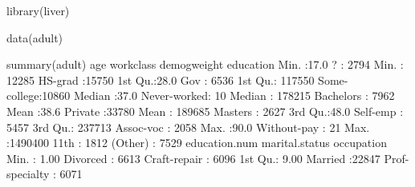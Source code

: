 \documentclass[
  11pt,
]{book}
\makeatletter
\newenvironment{Shaded}{}{}
\newcommand{\DecValTok}[1]{#1}
\newcommand{\FloatTok}[1]{#1}
\newcommand{\FunctionTok}[1]{#1}
\newcommand{\NormalTok}[1]{#1}
\newcommand{\SpecialCharTok}[1]{\textcolor[rgb]{0.39,0.39,0.39}{#1}}
\newenvironment{kframe}{%
\medskip{}
\setlength{\fboxsep}{.8em}
 \def\at@end@of@kframe{}%
 \ifinner\ifhmode%
  \def\at@end@of@kframe{\end{minipage}}%
  \begin{minipage}{\columnwidth}%
 \fi\fi%
 \def\FrameCommand##1{\hskip\@totalleftmargin \hskip-\fboxsep
 \colorbox{shadecolor}{##1}\hskip-\fboxsep
     \hskip-\linewidth \hskip-\@totalleftmargin \hskip\columnwidth}%
 \MakeFramed {\advance\hsize-\width
   \@totalleftmargin\z@ \linewidth\hsize
   \@setminipage}}%
 {\par\unskip\endMakeFramed%
 \at@end@of@kframe}
\renewenvironment{Shaded}{\begin{kframe}}{\end{kframe}}
\theoremstyle{definition}
\theoremstyle{definition}
\theoremstyle{definition}
\theoremstyle{definition}
\theoremstyle{remark}
\makeatother
\begin{document}
\begin{Shaded}
\begin{Highlighting}[]
\FunctionTok{library}\NormalTok{(liver)}

\FunctionTok{data}\NormalTok{(adult)}

\FunctionTok{summary}\NormalTok{(adult)}
\NormalTok{         age              workclass      demogweight             education    }
\NormalTok{    Min.   }\SpecialCharTok{:}\FloatTok{17.0}\NormalTok{   ?           }\SpecialCharTok{:} \DecValTok{2794}\NormalTok{   Min.   }\SpecialCharTok{:}  \DecValTok{12285}\NormalTok{   HS}\SpecialCharTok{{-}}\NormalTok{grad     }\SpecialCharTok{:}\DecValTok{15750}  
    \DecValTok{1}\NormalTok{st Qu.}\SpecialCharTok{:}\FloatTok{28.0}\NormalTok{   Gov         }\SpecialCharTok{:} \DecValTok{6536}   \DecValTok{1}\NormalTok{st Qu.}\SpecialCharTok{:} \DecValTok{117550}\NormalTok{   Some}\SpecialCharTok{{-}}\NormalTok{college}\SpecialCharTok{:}\DecValTok{10860}  
\NormalTok{    Median }\SpecialCharTok{:}\FloatTok{37.0}\NormalTok{   Never}\SpecialCharTok{{-}}\NormalTok{worked}\SpecialCharTok{:}   \DecValTok{10}\NormalTok{   Median }\SpecialCharTok{:} \DecValTok{178215}\NormalTok{   Bachelors   }\SpecialCharTok{:} \DecValTok{7962}  
\NormalTok{    Mean   }\SpecialCharTok{:}\FloatTok{38.6}\NormalTok{   Private     }\SpecialCharTok{:}\DecValTok{33780}\NormalTok{   Mean   }\SpecialCharTok{:} \DecValTok{189685}\NormalTok{   Masters     }\SpecialCharTok{:} \DecValTok{2627}  
    \DecValTok{3}\NormalTok{rd Qu.}\SpecialCharTok{:}\FloatTok{48.0}\NormalTok{   Self}\SpecialCharTok{{-}}\NormalTok{emp    }\SpecialCharTok{:} \DecValTok{5457}   \DecValTok{3}\NormalTok{rd Qu.}\SpecialCharTok{:} \DecValTok{237713}\NormalTok{   Assoc}\SpecialCharTok{{-}}\NormalTok{voc   }\SpecialCharTok{:} \DecValTok{2058}  
\NormalTok{    Max.   }\SpecialCharTok{:}\FloatTok{90.0}\NormalTok{   Without}\SpecialCharTok{{-}}\NormalTok{pay }\SpecialCharTok{:}   \DecValTok{21}\NormalTok{   Max.   }\SpecialCharTok{:}\DecValTok{1490400}   \DecValTok{11}\NormalTok{th        }\SpecialCharTok{:} \DecValTok{1812}  
\NormalTok{                                                          (Other)     }\SpecialCharTok{:} \DecValTok{7529}  
\NormalTok{    education.num         marital.status            occupation   }
\NormalTok{    Min.   }\SpecialCharTok{:} \FloatTok{1.00}\NormalTok{   Divorced     }\SpecialCharTok{:} \DecValTok{6613}\NormalTok{   Craft}\SpecialCharTok{{-}}\NormalTok{repair   }\SpecialCharTok{:} \DecValTok{6096}  
    \DecValTok{1}\NormalTok{st Qu.}\SpecialCharTok{:} \FloatTok{9.00}\NormalTok{   Married      }\SpecialCharTok{:}\DecValTok{22847}\NormalTok{   Prof}\SpecialCharTok{{-}}\NormalTok{specialty }\SpecialCharTok{:} \DecValTok{6071}  

\end{Highlighting}
\end{Shaded}
\end{document}
